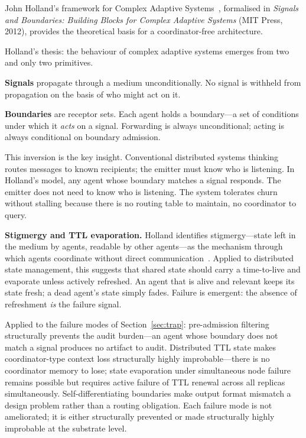 \documentclass[11pt]{article}
\begin{document}
John Holland's framework for Complex Adaptive Systems~\cite{holland,holland-intro},
formalised in \emph{Signals and Boundaries: Building Blocks for Complex Adaptive
Systems} (MIT Press, 2012), provides the theoretical basis for a coordinator-free
architecture.

Holland's thesis: the behaviour of complex adaptive systems emerges from two and
only two primitives.

\textbf{Signals} propagate through a medium unconditionally. No signal is withheld
from propagation on the basis of who might act on it.

\textbf{Boundaries} are receptor sets. Each agent holds a boundary---a set of
conditions under which it \emph{acts} on a signal. Forwarding is always
unconditional; acting is always conditional on boundary admission.

This inversion is the key insight. Conventional distributed systems thinking
routes messages to known recipients; the emitter must know who is listening. In
Holland's model, any agent whose boundary matches a signal responds. The emitter
does not need to know who is listening. The system tolerates churn without stalling
because there is no routing table to maintain, no coordinator to query.

\textbf{Stigmergy and TTL evaporation.} Holland identifies stigmergy---state left
in the medium by agents, readable by other agents---as the mechanism through which
agents coordinate without direct communication~\cite{dorigo}. Applied to
distributed state management, this suggests that shared state should carry a
time-to-live and evaporate unless actively refreshed. An agent that is alive and
relevant keeps its state fresh; a dead agent's state simply fades. Failure is
emergent: the absence of refreshment \emph{is} the failure signal.

Applied to the failure modes of Section~\ref{sec:trap}: pre-admission filtering
structurally prevents the audit burden---an agent whose boundary does not match a
signal produces no artifact to audit. Distributed TTL state makes
coordinator-type context loss structurally highly improbable---there is no
coordinator memory to lose; state evaporation under simultaneous node failure
remains possible but requires active failure of TTL renewal across all replicas
simultaneously. Self-differentiating boundaries make output format mismatch a
design problem rather than a routing obligation. Each failure mode is not
ameliorated; it is either structurally prevented or made structurally highly
improbable at the substrate level.
\end{document}
